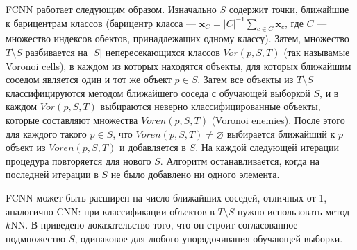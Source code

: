 FCNN работает следующим образом. Изначально \(S\) содержит точки, ближайшие к барицентрам классов (барицентр класса --- \(\mathbf{x}_C=|C|^{-1}\sum_{c\in C}\mathbf{x}_c\), где \(C\) --- множество индексов обектов, принадлежащих одному классу). Затем, множество \(T\setminus S\) разбивается на \(|S|\) непересекающихся классов \(Vor(p, S, T)\) (так называмые Voronoi cells), в каждом из которых находятся объекты, для которых ближайшим соседом является один и тот же объект \(p\in S\). Затем все объекты из \(T\setminus S\) классифицируются методом ближайшего соседа с обучающей выборкой \(S\), и в каждом \(Vor(p, S, T)\) выбираются неверно классифицированные объекты, которые составляют множества \(Voren(p, S, T)\) (Voronoi enemies). После этого для каждого такого \(p\in S\), что \(Voren(p, S, T)\neq\varnothing\) выбирается ближайший к \(p\) объект из \(Voren(p, S, T)\) и добавляется в \(S\). На каждой следующей итерации процедура повторяется для нового \(S\). Алгоритм останавливается, когда на последней итерации в \(S\) не было добавлено ни одного элемента.

FCNN может быть расширен на число ближайших соседей, отличных от 1, аналогично CNN: при классификации объектов в \(T\setminus S\) нужно использовать метод \(k\)NN. В \cite{angiulli} приведено доказательство того, что он строит согласованное подмножество \(S\), одинаковое для любого упорядочивания обучающей выборки.


